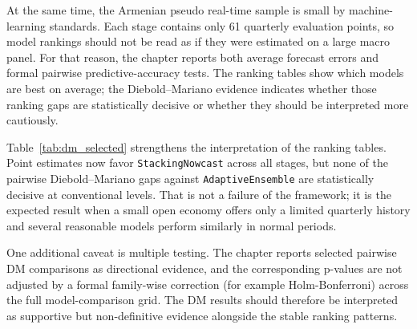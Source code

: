 \documentclass[12pt,a4paper]{article}
\begin{document}
At the same time, the Armenian pseudo real-time sample is small by machine-learning standards. Each stage contains only 61 quarterly evaluation points, so model rankings should not be read as if they were estimated on a large macro panel. For that reason, the chapter reports both average forecast errors and formal pairwise predictive-accuracy tests. The ranking tables show which models are best on average; the Diebold--Mariano evidence indicates whether those ranking gaps are statistically decisive or whether they should be interpreted more cautiously.

\begin{table}[H]
    \centering
    \small
    \caption{Selected Diebold--Mariano tests for the stage winners using one-step-ahead squared-error loss. Small p-values provide stronger evidence for the listed winner.}
    \label{tab:dm_selected}
\end{table}

Table~\ref{tab:dm_selected} strengthens the interpretation of the ranking tables. Point estimates now favor \texttt{StackingNowcast} across all stages, but none of the pairwise Diebold--Mariano gaps against \texttt{AdaptiveEnsemble} are statistically decisive at conventional levels. That is not a failure of the framework; it is the expected result when a small open economy offers only a limited quarterly history and several reasonable models perform similarly in normal periods.

One additional caveat is multiple testing. The chapter reports selected pairwise DM comparisons as directional evidence, and the corresponding p-values are not adjusted by a formal family-wise correction (for example Holm-Bonferroni) across the full model-comparison grid. The DM results should therefore be interpreted as supportive but non-definitive evidence alongside the stable ranking patterns.
\end{document}
